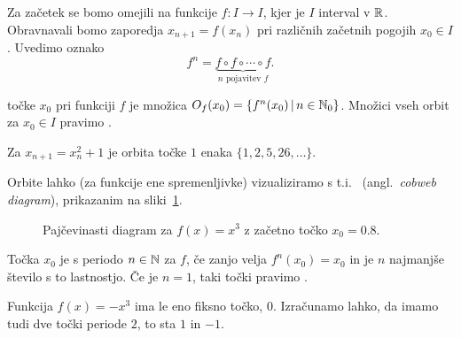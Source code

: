 

Za začetek se bomo omejili na funkcije $f: I \to I$, kjer je $I$ interval v
$\mathbb{R}$.
Obravnavali bomo zaporedja $x_{n+1} = f(x_n)$ pri različnih začetnih pogojih
$x_0 \in I$.
Uvedimo oznako
\[
  f^n = \underbrace{f \circ f \circ \cdots \circ f}_{\text{$n$ pojavitev $f$}}.
\]

\begin{definicija}
   točke $x_0$ pri funkciji $f$ je množica
  $O_f(x_0) = \{ f^n(x_0) \,|\, n \in \mathbb{N}_0 \}$.
  Množici vseh orbit za $x_0 \in I$ pravimo .
\end{definicija}

\begin{primer}
  Za $x_{n+1} = x_n^2 + 1$ je orbita točke $1$ enaka $\{ 1, 2, 5, 26, \ldots \}$.
\end{primer}

Orbite lahko (za funkcije ene spremenljivke) vizualiziramo s
t.i.~ (angl.~\textit{cobweb diagram}), prikazanim
na sliki~\ref{fig:ds-02-pajcevinasti-diagram}.

\begin{figure}[h!]
  \centering
  {
  \newcommand{\startv}{.8}
  }
  \caption[Pajčevinasti diagram]{Pajčevinasti diagram za $f(x) = x^3$ z začetno
	točko $x_0 = 0.8$.\footnotemark{}}%
  \label{fig:ds-02-pajcevinasti-diagram}
\end{figure}


\begin{definicija}
  Točka $x_0$ je  s periodo $n \in \mathbb{N}$ za $f$, če zanjo velja
  $f^n(x_0) = x_0$ in je $n$ najmanjše število s to lastnostjo.
  Če je $n = 1$, taki točki pravimo .
\end{definicija}

\begin{primer}
  Funkcija $f(x) = -x^3$ ima le eno fiksno točko, $0$.
  Izračunamo lahko, da imamo tudi dve točki periode $2$, to sta $1$ in $-1$.
\end{primer}

